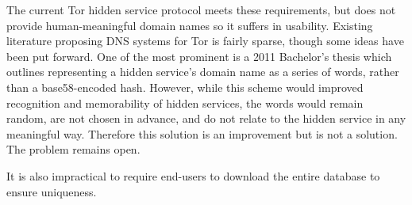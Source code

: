 The current Tor hidden service protocol meets these requirements, but does not provide human-meaningful domain names so it suffers in usability. Existing literature proposing DNS systems for Tor is fairly sparse, though some ideas have been put forward. One of the most prominent is a 2011 Bachelor's thesis which outlines representing a hidden service's domain name as a series of words, rather than a base58-encoded hash.\cite{NicolussiThesis2011} However, while this scheme would improved recognition and memorability of hidden services, the words would remain random, are not chosen in advance, and do not relate to the hidden service in any meaningful way. Therefore this solution is an improvement but is not a solution. The problem remains open.

It is also impractical to require end-users to download the entire database to ensure uniqueness.